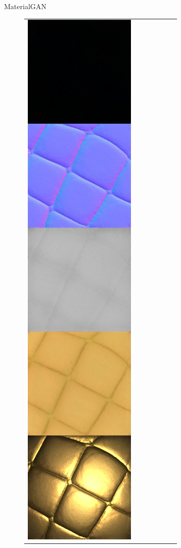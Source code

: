\documentclass[final]{beamer}
\newlength{\twocolwid}
\newlength{\resLen}
\begin{document}
\begin{frame}[t]
\begin{columns}[t]
\begin{column}{\twocolwid}
\begin{block}{MaterialGAN}
\begin{figure}
\begin{tabular}{ccccccc}
					\includegraphics[width=\resLen]{others/matgan/04.jpg} &

\end{tabular}
\end{figure}
\end{block}
\end{column}
\end{columns}
\end{frame}
\end{document}
